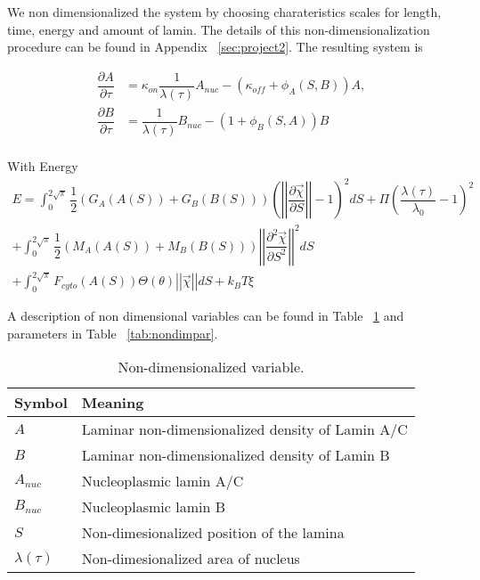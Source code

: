 We non dimensionalized the system by choosing charateristics scales for length, time, energy and amount of lamin. The details of this non-dimensionalization procedure can be found in Appendix ~\ref{sec:project2}. The resulting system is


\begin{align}
\dfrac{\partial A}{\partial \tau} &= \kappa_{on}\dfrac{1}{\lambda (\tau)} A_{nuc}  - (\kappa_{off}+ \phi_A (S,B)) A,  \\[10pt]
\dfrac{\partial B}{\partial \tau} &= \dfrac{1}{\lambda (\tau)} B_{nuc}  - (1+ \phi_B (S,A)) B  \\[10pt]
\end{align}

With Energy 
\begin{align}
 E = \displaystyle \int_0^{2 \sqrt{\pi}} \dfrac{1}{2} (G_A(A(S))+ G_B(B(S)))\left( \left |\left|  \dfrac{\partial \vec{\chi} }{\partial S} \right|\right| - 1\right)^2  dS + \Pi \left(\dfrac{\lambda(\tau)}{\lambda_0} -1\right)^2\\[10pt]
 +\displaystyle\int_0^{2\sqrt{\pi}} \dfrac{1}{2 } (M_A(A(S))+ M_B(B(S)))\left|\left| \dfrac{\partial^2 \vec{\chi}}{\partial S^2} \right|\right|^2 dS\\[10pt]
+ \displaystyle\int_0^{2\sqrt{\pi}} F_{cyto}(A(S))\Theta (\theta) \left|\left| \vec{\chi} \right|\right| dS +k_BT \xi
\end{align}

A description of non dimensional variables can be found in Table ~\ref{tab:nondimvar} and parameters in Table ~\ref{tab:nondimpar}.

\begin{table}[t!]
\caption{Non-dimensionalized variable.}\centering \label{tab:nondimvar} 
\begin{tabular}{ l  l}
\hline
Symbol  & Meaning \\
\hline
$A$ & Laminar non-dimensionalized density of Lamin A/C \\
$B$ & Laminar non-dimensionalized density of Lamin B  \\
$A_{nuc}$ & Nucleoplasmic lamin A/C \\
$B_{nuc}$ & Nucleoplasmic lamin B\\
$S$ & Non-dimesionalized position of the lamina\\
$\lambda(\tau)$ & Non-dimesionalized area of nucleus\\
\hline
\end{tabular}
\end{table}


